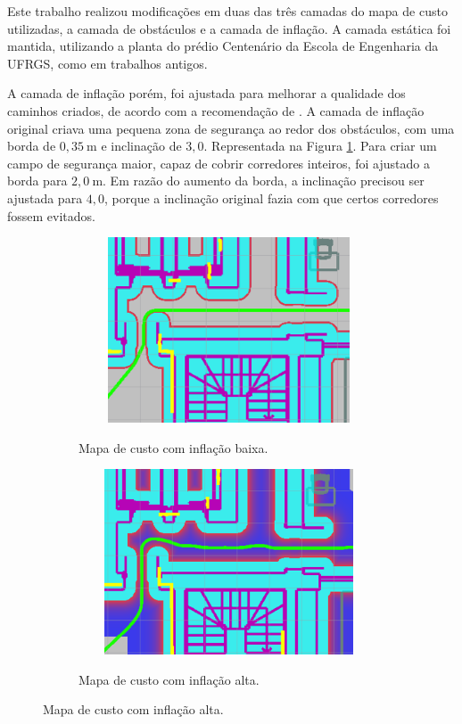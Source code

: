 \documentclass[repeatfields,xlists,xpacks,oneside,yearsonly]{ufrgscca}
\begin{document}
Este trabalho realizou modificações em duas das três camadas do mapa
de custo utilizadas, a camada de obstáculos e a camada de inflação. A
camada estática foi mantida, utilizando a planta do prédio Centenário
da Escola de Engenharia da UFRGS, como em trabalhos antigos.

A camada de inflação porém, foi ajustada para melhorar a qualidade
dos caminhos criados, de acordo com a recomendação de
\textcite{ros_tuning_guide}. A camada de inflação original criava uma
pequena zona de segurança ao redor dos obstáculos, com uma borda de
$0,35~\si{\meter}$ e inclinação de $3,0$. Representada na Figura
\ref{fig:inflation_low}. Para criar um campo de segurança maior,
capaz de cobrir corredores inteiros, foi ajustado a borda para
$2,0~\si{\meter}$. Em razão do aumento da borda, a inclinação
precisou ser ajustada para $4,0$, porque a inclinação original fazia
com que certos corredores fossem evitados.

\begin{figure}[h]
    \caption{Trajetórias criadas com diferentes configurações da camada de inflação}
    \begin{subfigure}{0.5\linewidth}
        {
            \centering
            \caption{Mapa de custo com inflação baixa.}
            \label{fig:inflation_low}
            \includegraphics[width=0.98\textwidth, height=5.5cm]{costmap_not_inflated.png}\\
        }
    \end{subfigure}
    \begin{subfigure}{0.5\linewidth}
        {
            \centering
            \caption{Mapa de custo com inflação alta.}
            \label{fig:inflation_high}
            \includegraphics[width=0.98\textwidth, height=5.5cm]{costmap_inflated.png}\\
        }
    \end{subfigure}
\end{figure}
\end{document}
